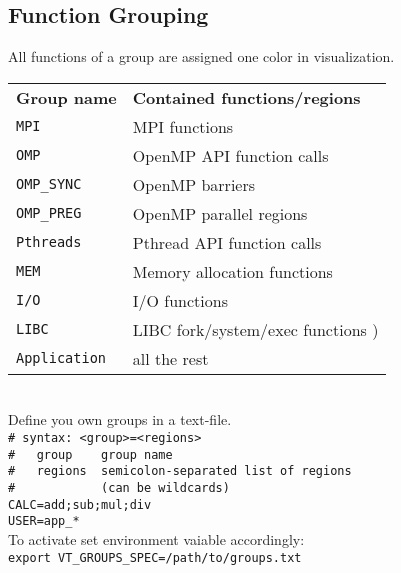 \begin{multicols}{3}
\section{Function Grouping}
All functions of a group are assigned one color in visualization.
\begin{tabular}{@{}ll@{}}
\textbf{Group name} & \textbf{Contained functions/regions}\\
\texttt{MPI}  & MPI functions\\
\texttt{OMP}  & OpenMP API function calls\\
\texttt{OMP\_SYNC} & OpenMP barriers \\
\texttt{OMP\_PREG} & OpenMP parallel regions \\
\texttt{Pthreads} & Pthread API function calls \\
\texttt{MEM}  & Memory allocation functions \\
\texttt{I/O}  & I/O functions \\
\texttt{LIBC} & LIBC fork/system/exec functions )\\
\texttt{Application} & all the rest\\
\end{tabular}\\
Define you own groups in a text-file.\\
\verb!# syntax: <group>=<regions>!\\
\verb!#   group    group name !\\
\verb!#   regions  semicolon-separated list of regions!\\
\verb!#            (can be wildcards)!\\
\verb!CALC=add;sub;mul;div!\\
\verb!USER=app_*!\\
To activate set environment vaiable accordingly:\\
\texttt{export VT\_GROUPS\_SPEC=/path/to/groups.txt}\\





\end{multicols}


